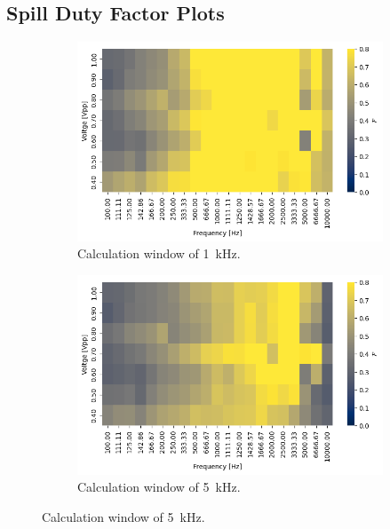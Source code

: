 \documentclass[a4paper,twoside,11pt]{report}
\begin{document}
\begin{appendices}
\chapter{Spill Duty Factor Plots}
\begin{figure}[ht]
  \centering
  \begin{subfigure}{.5\textwidth}
    \centering
    \includegraphics[width=.9\linewidth]{sdfs/on_1.png}
    \caption{Calculation window of \qty{1}{\kilo\hertz}.}
    \label{fig:sdf_on_1}
  \end{subfigure}%
  \begin{subfigure}{.5\textwidth}
    \centering
    \includegraphics[width=.9\linewidth]{sdfs/on_5.png}
    \caption{Calculation window of \qty{5}{\kilo\hertz}.}
    \label{fig:sdf_on_5}
  \end{subfigure}
  

\end{figure}
\end{appendices}
\end{document}
